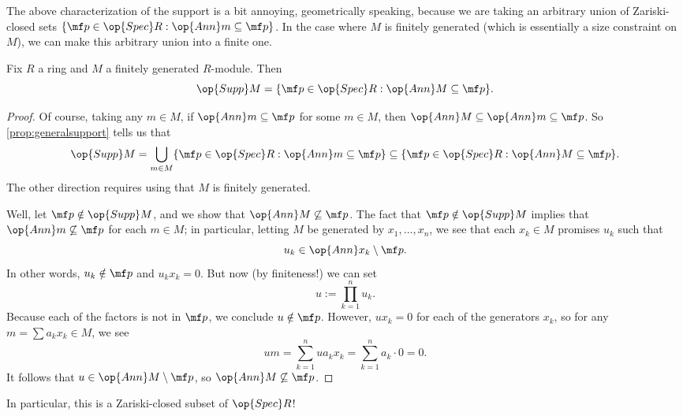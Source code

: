 The above characterization of the support is a bit annoying, geometrically speaking, because we are taking an arbitrary union of Zariski-closed sets $\{\mf p\in\op{Spec}R:\op{Ann}m\subseteq\mf p\}$. In the case where $M$ is finitely generated (which is essentially a size constraint on $M$), we can make this arbitrary union into a finite one.
\begin{proposition} \label{prop:fingensupport}
	Fix $R$ a ring and $M$ a finitely generated $R$-module. Then
	\[\op{Supp}M=\{\mf p\in\op{Spec}R:\op{Ann}M\subseteq\mf p\}.\]
\end{proposition}
\begin{proof}
	Of course, taking any $m\in M$, if $\op{Ann}m\subseteq\mf p$ for some $m\in M$, then $\op{Ann}M\subseteq\op{Ann}m\subseteq\mf p$. So \autoref{prop:generalsupport} tells us that
	\[\op{Supp}M=\bigcup_{m\in M}\{\mf p\in\op{Spec}R:\op{Ann}m\subseteq\mf p\}\subseteq\{\mf p\in\op{Spec}R:\op{Ann}M\subseteq\mf p\}.\]
	The other direction requires using that $M$ is finitely generated.

	Well, let $\mf p\notin\op{Supp}M$, and we show that $\op{Ann}M\not\subseteq\mf p$. The fact that $\mf p\notin\op{Supp}M$ implies that $\op{Ann}m\not\subseteq\mf p$ for each $m\in M$; in particular, letting $M$ be generated by $x_1,\ldots,x_n$, we see that each $x_k\in M$ promises $u_k$ such that
	\[u_k\in\op{Ann}x_k\setminus\mf p.\]
	In other words, $u_k\notin\mf p$ and $u_kx_k=0$. But now (by finiteness!) we can set
	\[u:=\prod_{k=1}^nu_k.\]
	Because each of the factors is not in $\mf p$, we conclude $u\notin\mf p$. However, $ux_k=0$ for each of the generators $x_k$, so for any $m=\sum a_kx_k\in M$, we see
	\[um=\sum_{k=1}^nua_kx_k=\sum_{k=1}^na_k\cdot0=0.\]
	It follows that $u\in\op{Ann}M\setminus\mf p$, so $\op{Ann}M\not\subseteq\mf p$.
\end{proof}
In particular, this is a Zariski-closed subset of $\op{Spec}R$!

